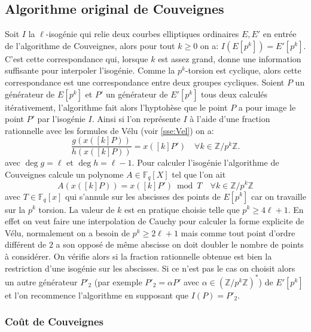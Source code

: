 \documentclass[10pt,a4paper]{book}
\theoremstyle{plain}
\theoremstyle{definition}
\theoremstyle{definition}
\theoremstyle{definition}
\theoremstyle{definition}
\theoremstyle{remark}
\theoremstyle{remark}
\theoremstyle{definition}
\begin{document}
\subsection{Algorithme original de Couveignes}
\label{sub:ori:cou}
Soit $I$ la $\ell$-isogénie qui relie deux courbes elliptiques ordinaires $E,E'$ en entrée de l'algorithme de Couveignes, alors pour tout $k \geqslant 0$ on a: $I(E[p^k])=E'[p^k]$.
C'est cette correspondance qui, lorsque $k$ est assez grand, donne une information suffisante pour interpoler l'isogénie. Comme la $p^k$-torsion est cyclique, alors cette correspondance est une correspondance entre deux groupes cycliques. Soient $P$ un générateur de $E[p^k]$ et $P'$ un générateur de $E'[p^k]$ tous deux calculés itérativement, l'algorithme fait alors l'hyptohèse que le point $P$ a pour image le point $P'$ par l'isogénie $I$. Ainsi si l'on représente $I$ à l'aide d'une fraction rationnelle avec les formules de Vélu (voir \ref{sse:Vel}) on a:
\begin{equation}
\frac{g(x([k] P))}{h(x([k] P))}=x([k] P') \quad \forall k \in \mathbb{Z}/p^{k}\mathbb{Z}.
\end{equation}
avec $\deg g = \ell$ et $\deg h = \ell-1$.
Pour calculer l'isogénie l'algorithme de Couveignes calcule un polynome $A \in \mathbb{F}_q[X]$ tel que l'on ait 
\begin{equation}
A(x([k] P))= x([k] P') \bmod T \quad \forall k \in \mathbb{Z}/p^{k}\mathbb{Z}
\end{equation} 
avec $T \in \mathbb{F}_q[x]$ qui s'annule sur les abscisses des points de $E[p^k]$ car on travaille sur la $p^k$ torsion. La valeur de $k$ est en pratique choisie telle que $p^k \geqslant 4 \ell+1$. En effet on veut faire une interpolation de Cauchy pour calculer la forme explicite de Vélu, normalement on a besoin de $p^k \geqslant 2 \ell +1$ mais comme tout point d'ordre différent de $2$ a son opposé de même abscisse on doit doubler le nombre de points à considérer. On vérifie alors si la fraction rationnelle obtenue est bien la restriction d'une isogénie sur les abscisses. Si ce n'est pas le cas on choisit alors un autre générateur $P'_2$ (par exemple $P'_2=\alpha P'$ avec $\alpha \in \left( \mathbb{Z}/p^k \mathbb{Z} \right)^* $) de $E'[p^k]$ et l'on recommence l'algorithme en supposant que $I(P)=P'_2$.

\subsubsection{Coût de Couveignes}
\end{document}
